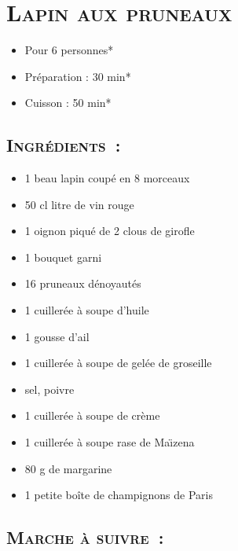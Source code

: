 \section[\normalsize{Lapin aux pruneaux}]{\LARGE{\textsc{Lapin aux pruneaux}}}		%


\begin{itemize}
\item Pour 6 personnes*
\item Préparation : 30 min*
\item Cuisson : 50 min*
\end{itemize}

\subsection*{\textsc{Ingr\'edients~:}}

\begin{itemize}
\item	1 beau lapin coup\'e en 8 morceaux
\item	50 cl litre de vin rouge
\item	1 oignon piqu\'e de 2 clous de girofle
\item	1 bouquet garni
\item	16 pruneaux d\'enoyaut\'es 
\item	1 cuiller\'ee \`a soupe d’huile
\item	1 gousse d’ail
\item	1 cuiller\'ee \`a soupe de gel\'ee de groseille
\item	sel, poivre
\item	1 cuiller\'ee \`a soupe de cr\`eme
\item	1 cuiller\'ee \`a soupe rase de Ma\"\i zena
\item	80 g de margarine
\item	1 petite boîte de champignons de Paris
\end{itemize}


\subsection*{\textsc{Marche \`a suivre~:}}

